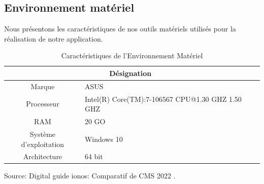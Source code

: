 \subsection{Environnement matériel}
Nous présentons les caractéristiques de nos outils matériels utilisés pour la réalisation de notre application.
\begin{table}[!h]
	\centering %
	\begin{tabular}{ |c|p{10cm}| } 
		
		
		\hline%
		\centering{\textbf{Type}} & \textbf{~~~~~~Désignation} \\
		\hline
	Marque & ASUS\\ 
		\hline  
		Processeur & Intel(R) Core(TM):7-106567 CPU@1.30 GHZ 1.50 GHZ   \\ 
		\hline
		RAM & 20 GO  \\
		\hline
	Système d'exploitation & Windows 10 \\ 
		
		\hline 
		Architecture & 64 bit \\
		\hline
		
	\end{tabular}
	\begin{flushright}
		\footnotesize Source: Digital guide ionos: Comparatif de CMS 2022 .\end{flushright}
	\caption{Caractéristiques de l'Environnement Matériel}
\end{table}

